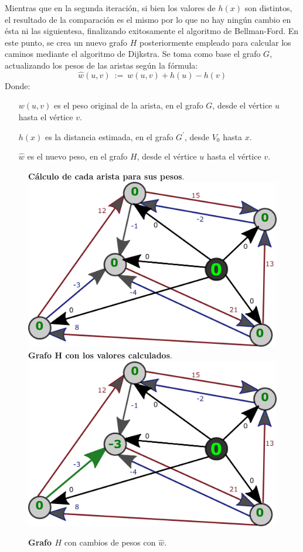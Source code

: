 \documentclass[../tp2_grupo404.tex]{subfiles}
\begin{document}
Mientras que en la segunda iteración, si bien los valores de $h(x)$
son distintos, el resultado de la comparación es el mismo
por lo que no hay ningún cambio en ésta ni las siguientesa,
finalizando exitosamente el algoritmo de Bellman-Ford.
En este punto, se crea un nuevo grafo $H$ posteriormente empleado
para calcular los caminos mediante el algoritmo de Dijkstra.
Se toma como base el grafo $G$, actualizando los pesos de las aristas
según la fórmula:
$$\hat{w}(u,v)~:=~w(u,v) + h(u) - h(v)$$
Donde:
\begin{itemize}
    \item[$w(u,v)$] es el peso original de la arista, en el grafo $G$, desde el vértice $u$ hasta el vértice $v$.
    \item[$h(x)$] es la distancia estimada, en el grafo $G^\prime$, desde $V_0$ hasta $x$.
    \item[$\hat{w}$] es el nuevo peso, en el grafo $H$, desde el vértice $u$ hasta el vértice $v$.
\end{itemize} 

\begin{figure}[H]
    \centering
    \subcaptionbox
        {\label{fig:FordCambios0}\textbf{Cálculo de cada arista para sus pesos}.}
        {\includegraphics[width=0.4\linewidth,angle=0,origin=c]{out/ford/ford1C.png}}
    \subcaptionbox
        {\label{fig:FordCambios1}\textbf{Grafo H con los valores calculados}.}
        {\includegraphics[width=0.4\linewidth,angle=0,origin=c]{out/ford/ford1D.png}}
    \caption{\label{fig:GrafoH}\textbf{Grafo $H$} con cambios de pesos con $\hat{w}$.}
\end{figure}
\end{document}
